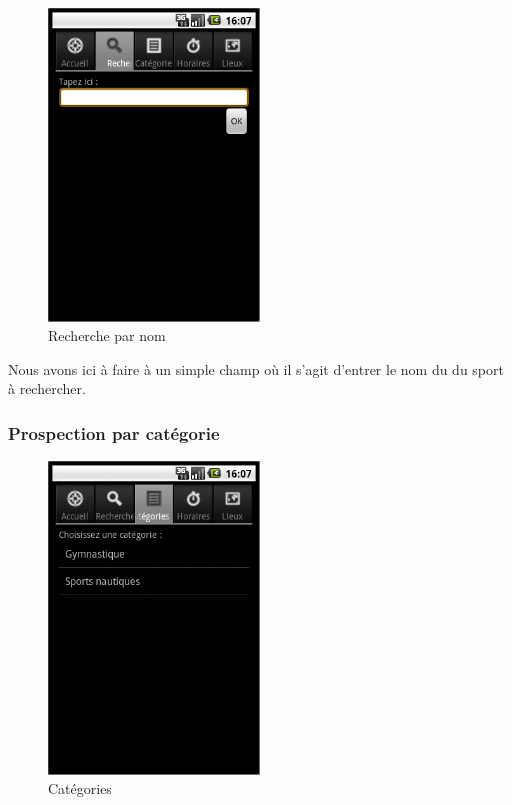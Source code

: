 \documentclass[french, titlepage, 11pt, a4paper]{article}
\begin{document}
		\begin{figure}[ht]
			\centering
			\includegraphics[width=0.5\textwidth]{recherche.png}
			\caption{Recherche par nom}
			\label{fig:recherche}
		\end{figure}

		Nous avons ici à faire à un simple champ où il s'agit d'entrer le nom du
		du sport à rechercher.

		\subsubsection{Prospection par catégorie}

		\begin{figure}[ht]
			\centering
			\includegraphics[width=0.5\textwidth]{categories.png}
			\caption{Catégories}
			\label{fig:categories}
		\end{figure}
\end{document}
